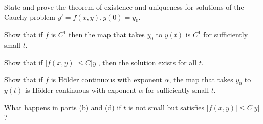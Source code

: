 \begin{alist}
\item State and prove the theorem of existence and uniqueness for
solutions of the Cauchy problem $y'=f(x,y), y(0)=y_0$.
\item Show that if $f$ is $C^1$ then the map that takes $y_0$ to
$y(t)$ is $C^1$ for sufficiently small $t$.
\item Show that if $|f(x,y)|\leq C|y|$, then the solution exists for
all $t$.
\item Show that if $f$ is H\"older continuous with exponent $\alpha$,
the map that takes $y_0$ to $y(t)$ is H\"older continuous with
exponent $\alpha$ for sufficiently small $t$.
\item What happens in parts (b) and (d) if $t$ is not small but
satisfies $|f(x,y)|\leq C|y|$?
\end{alist}
